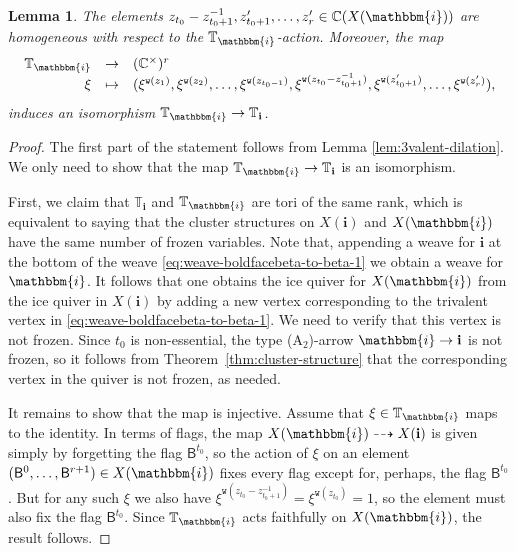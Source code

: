 \documentclass[a4paper, 11pt]{amsart}
\newcommand{\flag}[1]{\mathsf{B}^{#1}}
\newcommand{\word}[1]{\mathbf{#1}}
\newcommand{\wword}[1]{\mathbbm{#1}}
\newcommand{\C}{\mathbb{C}}
\newcommand{\wt}{\mathtt{w}}
\newcommand{\dil}[1]{\mathbb{T}_{#1}}
\newtheorem{lemma}[theorem]{Lemma}%
\theoremstyle{definition}
\begin{document}
\begin{lemma}\label{lem:iso-tori}
    The elements $z_{t_0} - z_{t_0+1}^{-1}, z_{t_0+1}', \dots, z_r' \in \C(X(\wword{i}))$ are homogeneous with respect to the $\dil{\wword{i}}$-action. Moreover, the map
    \[
    \begin{array}{rcl}
    \dil{\wword{i}} & \to & (\C^{\times})^{r} \\
    \xi & \mapsto & (\xi^{\wt(z_1)}, \xi^{\wt(z_2)}, \dots, \xi^{\wt(z_{t_0-1})}, \xi^{\wt(z_{t_0} - z_{t_0+1}^{-1})}, \xi^{\wt(z'_{t_0+1})}, \dots, \xi^{\wt(z_r')}),
    \end{array}
    \]
    induces an isomorphism $\dil{\wword{i}} \to \dil{\word{i}}$.
\end{lemma}
\begin{proof}
The first part of the statement follows from Lemma \ref{lem:3valent-dilation}. We only need to show that the map $\dil{\wword{i}} \to \dil{\word{i}}$ is an isomorphism.

First, we claim that $\dil{\word{i}}$ and $\dil{\wword{i}}$ are tori of the same rank, which is equivalent to saying that the cluster structures on $X(\word{i})$ and $X(\wword{i})$ have the same number of frozen variables. Note that, appending a weave for $\word{i}$ at the bottom of the weave \eqref{eq:weave-boldfacebeta-to-beta-1} we obtain a weave for $\wword{i}$. It follows that one obtains the ice quiver for $X(\wword{i})$ from the ice quiver in $X(\word{i})$ by adding a new vertex corresponding to the trivalent vertex in \eqref{eq:weave-boldfacebeta-to-beta-1}. We need to verify that this vertex is not frozen. Since $t_0$ is non-essential, the type ($\mathrm{A}_2$)-arrow $\wword{i} \to \word{i}$ is not frozen, so it follows from  Theorem~\ref{thm:cluster-structure} that the corresponding vertex in the quiver is not frozen, as needed.


It remains to show that the map is injective. Assume that $\xi \in \dil{\wword{i}}$ maps to the identity. In terms of flags, the map $X(\wword{i}) \dashrightarrow X(\word{i})$ is given simply by forgetting the flag $\flag{t_0}$, so the action of $\xi$ on an element $(\flag{0}, \dots, \flag{r+1}) \in X(\wword{i})$ fixes every flag except for, perhaps, the flag $\flag{t_0}$. But for any such $\xi$ we also have $\xi^{\wt(z_{t_0} - z_{t_0+1}^{-1})} = \xi^{\wt(z_{t_0})} = 1$, so the element must also fix the flag $\flag{t_0}$. Since $\dil{\wword{i}}$ acts faithfully on $X(\wword{i})$, the result follows. 
\end{proof}
\end{document}
